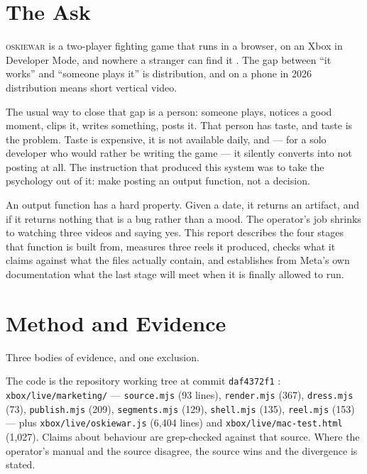 \documentclass[10pt,letterpaper,twocolumn]{article}
\newcommand{\game}{\textsc{oskiewar}}
\newcommand{\code}[1]{\texttt{#1}}
\begin{document}
\section{The Ask}

\game{} is a two-player fighting game that runs in a browser, on an Xbox in
Developer Mode, and nowhere a stranger can find it \cite{scudder2026oskiewar,
scudder2026store}. The gap between ``it works'' and ``someone plays it'' is
distribution, and on a phone in 2026 distribution means short vertical video.

The usual way to close that gap is a person: someone plays, notices a good
moment, clips it, writes something, posts it. That person has taste, and taste
is the problem. Taste is expensive, it is not available daily, and --- for a
solo developer who would rather be writing the game --- it silently converts
into not posting at all. The instruction that produced this system was to take
the psychology out of it: make posting an output function, not a decision.

An output function has a hard property. Given a date, it returns an artifact,
and if it returns nothing that is a bug rather than a mood. The operator's job
shrinks to watching three videos and saying yes. This report describes the four
stages that function is built from, measures three reels it produced, checks
what it claims against what the files actually contain, and establishes from
Meta's own documentation what the last stage will meet when it is finally
allowed to run.

\section{Method and Evidence}

Three bodies of evidence, and one exclusion.

The code is the repository working tree at commit \code{daf4372f1}
\cite{acrepo}: \code{xbox/live/marketing/} --- \code{source.mjs} (93 lines),
\code{render.mjs} (367), \code{dress.mjs} (73), \code{publish.mjs} (209),
\code{segments.mjs} (129), \code{shell.mjs} (135), \code{reel.mjs} (153) --- plus
\code{xbox/live/oskiewar.js} (6,404 lines) and \code{xbox/live/mac-test.html}
(1,027). Claims about behaviour are grep-checked against that source. Where the
operator's manual \cite{acmarketing} and the source disagree, the source wins
and the divergence is stated.
\end{document}
